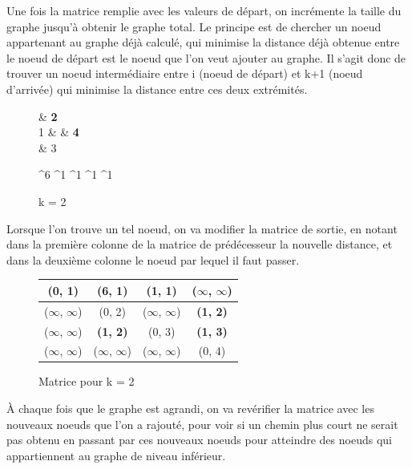 \documentclass[a4paper,12pt,final] {article}
\begin{document}
Une fois la matrice remplie avec les valeurs de départ, on incrémente la taille du graphe jusqu'à obtenir le graphe total. Le principe est de chercher un noeud appartenant au graphe déjà calculé, qui minimise la distance déjà obtenue entre le noeud de départ est le noeud que l'on veut ajouter au graphe. Il s'agit donc de trouver un noeud intermédiaire entre i (noeud de départ) et  k+1 (noeud d'arrivée) qui minimise la distance entre ces deux extrémités.\\

\begin{figure}[htpd]
 \centering
 \begin{psmatrix}[mnode=circle]
	    & {\color{red} \bf 2}\\
	 1 &    & {\color{red} \bf 4}\\
	    & 3\\
\end{psmatrix}
	
	^{6}
	^{1}
	^{1}
	^{1}
	^{1}

  \caption{k = 2}
\end{figure}

Lorsque l'on trouve un tel noeud, on va modifier la matrice de sortie, en notant dans la première colonne de la matrice de prédécesseur la nouvelle distance, et dans la deuxième colonne le noeud par lequel il faut passer.\\

\begin{figure}[htpd]
\begin{center}
\begin{tabular}{|c|c|c|c|}
\hline
(0, 1) & (6, 1) & (1, 1) & ($\infty$, $\infty$) \\
\hline
($\infty$, $\infty$) & (0, 2) & ($\infty$, $\infty$) & {\color{red} \bf (1, 2)} \\
\hline
($\infty$, $\infty$) & {\color{red} \bf (1, 2)} & (0, 3) & {\color{red} \bf (1, 3)}\\
\hline
($\infty$, $\infty$) & ($\infty$, $\infty$) & ($\infty$, $\infty$) & (0, 4) \\
\hline
\end{tabular}
\end{center}
\caption{Matrice pour k = 2}
\end{figure}

À chaque fois que le graphe est agrandi, on va revérifier la matrice avec les nouveaux noeuds que l'on a rajouté, pour voir si un chemin plus court ne serait pas obtenu en passant par ces nouveaux noeuds pour atteindre des noeuds qui appartiennent au graphe de niveau inférieur.\\
\end{document}

